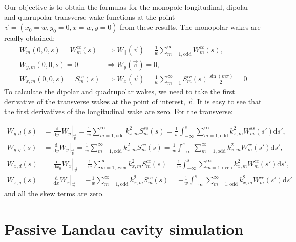 \begin{apendicesenv}
    Our objective is to obtain the formulas for the monopole longitudinal, dipolar and quarupolar transverse wake functions at the point $\vec{v} = (x_0=w,y_0=0,x=w,y=0)$ from these results. The monopolar wakes are readly obtained:
    \begin{align}
		W_m(0,0,s) = W^{cc}_m(s) &\Rightarrow W_{||}(\vec{v}) = \frac1w\sum^\infty_{m=1,\mathrm{odd}} W^{cc}_m(s), \\[4mm]
		W_{y,m}(0,0,s) = 0 &\Rightarrow W_y(\vec{v}) = 0, \\[4mm]
		W_{x,m}(0,0,s) = S^{cc}_m(s) &\Rightarrow W_x(\vec{v}) = \frac1w\sum^\infty_{m=1} S^{cc}_m(s)\frac{\sin(m\pi)}{2} = 0
    \end{align}
    To calculate the dipolar and quadrupolar wakes, we need to take the first derivative of the transverse wakes at the point of interest, $\vec{v}$. It is easy to see that the first derivatives of the longitudinal wake are zero. For the transverse:

    \begin{align}
		W_{y,d}(s) &= \left.\frac{\mathrm{d}}{\mathrm{d}y_0}W_y\right|_{\vec{v}} = \frac1w\sum^\infty_{m=1,\mathrm{odd}} k_{x,m}^2 S^{ss}_m(s) = \frac1w\int_{-\infty}^s\sum^\infty_{m=1,\mathrm{odd}} k_{x,m}^2 W^{ss}_m(s') \mathrm{d}s',\\[4mm]
		W_{y,q}(s) &= \left.\frac{\mathrm{d}}{\mathrm{d}y}W_y\right|_{\vec{v}} = \frac1w\sum^\infty_{m=1,\mathrm{odd}} k_{x,m}^2 S^{cc}_m(s) = \frac1w\int_{-\infty}^s\sum^\infty_{m=1,\mathrm{odd}} k_{x,m}^2 W^{cc}_m(s') \mathrm{d}s', \\[4mm]
		W_{x,d}(s) &= \left.\frac{\mathrm{d}}{\mathrm{d}x_0}W_x\right|_{\vec{v}} = \frac1w\sum^\infty_{m=1,\mathrm{even}} k_{x,m}^2 S^{cc}_m(s) = \frac1w\int_{-\infty}^s\sum^\infty_{m=1,\mathrm{even}}k_{x,m}^2 W^{cc}_m(s') \mathrm{d}s', \\[4mm]
		W_{x,q}(s) &= \left.\frac{\mathrm{d}}{\mathrm{d}x}W_x\right|_{\vec{v}} = -\frac1w\sum^\infty_{m=1,\mathrm{odd}} k_{x,m}^2 S^{cc}_m(s) =-\frac1w\int_{-\infty}^s\sum^\infty_{m=1,\mathrm{odd}} k_{x,m}^2 W^{cc}_m(s') \mathrm{d}s'
    \end{align}
    and all the skew terms are zero.


\chapter{Passive Landau cavity simulation}\label{app:passive_landau_cavity}


\end{apendicesenv}
